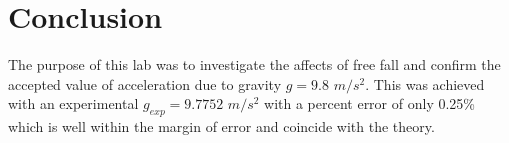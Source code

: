 \documentclass[12pt]{report}
\begin{document}
\section{Conclusion}
The purpose of this lab was to investigate the affects of free fall and confirm the accepted value of acceleration due to gravity $g = 9.8$ $m/s^2$. This was achieved with an experimental $g_{exp} = 9.7752$ $m/s^2$ with a percent error of only 0.25\% which is well within the margin of error and coincide with the theory.
\end{document}
